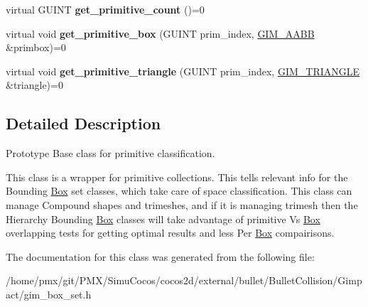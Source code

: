 \begin{DoxyCompactItemize}
virtual G\+U\+I\+NT {\bfseries get\+\_\+primitive\+\_\+count} ()=0
\item 
\mbox{\label{classGIM__PRIMITIVE__MANAGER__PROTOTYPE_a346c6eddcf63f67097a3d564ada57661}} 
virtual void {\bfseries get\+\_\+primitive\+\_\+box} (G\+U\+I\+NT prim\+\_\+index, \hyperlink{classGIM__AABB}{G\+I\+M\+\_\+\+A\+A\+BB} \&primbox)=0
\item 
\mbox{\label{classGIM__PRIMITIVE__MANAGER__PROTOTYPE_ad123d015b328ccfd1adee56517fd4b17}} 
virtual void {\bfseries get\+\_\+primitive\+\_\+triangle} (G\+U\+I\+NT prim\+\_\+index, \hyperlink{classGIM__TRIANGLE}{G\+I\+M\+\_\+\+T\+R\+I\+A\+N\+G\+LE} \&triangle)=0
\end{DoxyCompactItemize}


\subsection{Detailed Description}
Prototype Base class for primitive classification. 

This class is a wrapper for primitive collections. This tells relevant info for the Bounding \hyperlink{classBox}{Box} set classes, which take care of space classification. This class can manage Compound shapes and trimeshes, and if it is managing trimesh then the Hierarchy Bounding \hyperlink{classBox}{Box} classes will take advantage of primitive Vs \hyperlink{classBox}{Box} overlapping tests for getting optimal results and less Per \hyperlink{classBox}{Box} compairisons. 

The documentation for this class was generated from the following file\+:\begin{DoxyCompactItemize}
\item 
/home/pmx/git/\+P\+M\+X/\+Simu\+Cocos/cocos2d/external/bullet/\+Bullet\+Collision/\+Gimpact/gim\+\_\+box\+\_\+set.\+h\end{DoxyCompactItemize}

